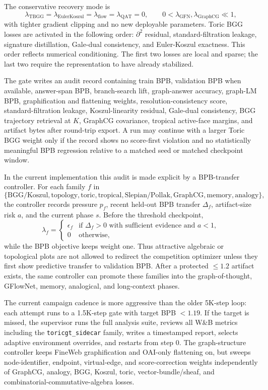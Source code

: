 \documentclass[11pt]{article}
\theoremstyle{definition}
\theoremstyle{plain}
\theoremstyle{remark}
\numberwithin{equation}{section}
\begin{document}
The conservative recovery mode is
\begin{equation}
  \lambda_{\mathrm{TBGG}}=\lambda_{\mathrm{EulerKoszul}}=\lambda_{\mathrm{flow}}=\lambda_{\mathrm{QAT}}=0,
  \qquad 0<\lambda_{\mathrm{GFN}},\lambda_{\mathrm{GraphCG}}\ll1,
\end{equation}
with tighter gradient clipping and no new deployable parameters.  Toric BGG losses are activated in the following order: $\partial^2$ residual, standard-filtration leakage, signature distillation, Gale-dual consistency, and Euler-Koszul exactness.  This order reflects numerical conditioning.  The first two losses are local and sparse; the last two require the representation to have already stabilized.

The gate writes an audit record containing train BPB, validation BPB when
available, answer-span BPB, branch-search lift, graph-answer accuracy,
graph-LM BPB, graphification and flattening weights, resolution-consistency
score, standard-filtration leakage, Koszul-linearity residual, Gale-dual
consistency, BGG trajectory retrieval at $K$, GraphCG covariance, tropical
active-face margins, and artifact bytes after round-trip export.  A run may
continue with a larger Toric BGG weight only if the record shows no
score-first violation and no statistically meaningful BPB regression relative
to a matched seed or matched checkpoint window.

In the current implementation this audit is made explicit by a BPB-transfer controller.  For each family $f$ in
\[
  \{\mathrm{BGG/Koszul},\mathrm{topology},\mathrm{toric},\mathrm{tropical},
  \mathrm{Slepian/Pollak},\mathrm{GraphCG},\mathrm{memory},\mathrm{analogy}\},
\]
the controller records pressure $p_f$, recent held-out BPB transfer $\Delta_f$, artifact-size risk $a$, and the current phase $s$.  Before the threshold checkpoint,
\[
  \lambda_f =
  \begin{cases}
    \epsilon_f & \text{if } \Delta_f>0 \text{ with sufficient evidence and } a<1,\\
    0 & \text{otherwise,}
  \end{cases}
\]
while the BPB objective keeps weight one.  Thus attractive algebraic or topological plots are not allowed to redirect the competition optimizer unless they first show predictive transfer to validation BPB.  After a protected $\le1.2$ artifact exists, the same controller can promote these families into the graph-of-thought, GFlowNet, memory, analogical, and long-context phases.

The current campaign cadence is more aggressive than the older 5K-step loop:
each attempt runs to a 1.5K-step gate with target BPB $<1.19$.  If the target
is missed, the supervisor runs the full analysis suite, reviews all W\&B
metrics including the \texttt{toricgt\_sidecar} family, writes a timestamped
report, selects adaptive environment overrides, and restarts from step $0$.
The graph-structure controller keeps FineWeb graphification and OAI-only
flattening on, but sweeps node-identifier, endpoint, virtual-edge, and
score-correction weights independently of GraphCG, analogy, BGG, Koszul,
toric, vector-bundle/sheaf, and combinatorial-commutative-algebra losses.
\end{document}
